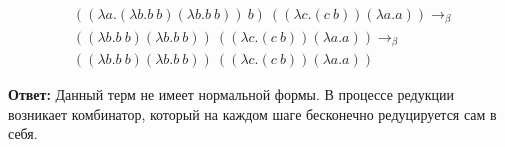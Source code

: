 \documentclass{article}
\begin{document}
\begin{align*}
& ((\lambda a . (\lambda b . b \ b) (\lambda b . b \ b) ) \ b) \ ((\lambda c . (c \ b)) (\lambda a . a)) \rightarrow_\beta \
\\ & ((\lambda b . b \ b) (\lambda b . b \ b)) \ ((\lambda c . (c \ b)) (\lambda a . a)) \rightarrow_\beta \
\\ & ((\lambda b . b \ b) (\lambda b . b \ b)) \ ((\lambda c . (c \ b)) (\lambda a . a))
\end{align*}

\textbf{Ответ:} Данный терм не имеет нормальной формы. В процессе редукции возникает комбинатор, который на каждом шаге бесконечно редуцируется сам в себя.
\end{document}
